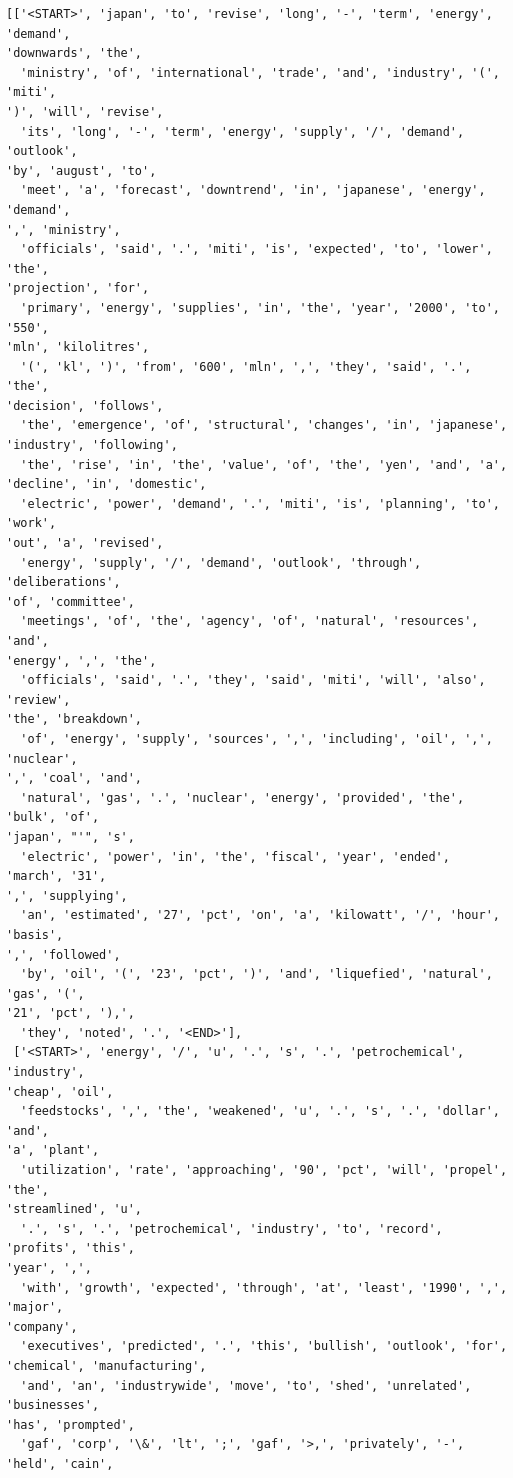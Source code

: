 \documentclass[11pt]{article}
\begin{document}
    \begin{Verbatim}[commandchars=\\\{\}]
[['<START>', 'japan', 'to', 'revise', 'long', '-', 'term', 'energy', 'demand',
'downwards', 'the',
  'ministry', 'of', 'international', 'trade', 'and', 'industry', '(', 'miti',
')', 'will', 'revise',
  'its', 'long', '-', 'term', 'energy', 'supply', '/', 'demand', 'outlook',
'by', 'august', 'to',
  'meet', 'a', 'forecast', 'downtrend', 'in', 'japanese', 'energy', 'demand',
',', 'ministry',
  'officials', 'said', '.', 'miti', 'is', 'expected', 'to', 'lower', 'the',
'projection', 'for',
  'primary', 'energy', 'supplies', 'in', 'the', 'year', '2000', 'to', '550',
'mln', 'kilolitres',
  '(', 'kl', ')', 'from', '600', 'mln', ',', 'they', 'said', '.', 'the',
'decision', 'follows',
  'the', 'emergence', 'of', 'structural', 'changes', 'in', 'japanese',
'industry', 'following',
  'the', 'rise', 'in', 'the', 'value', 'of', 'the', 'yen', 'and', 'a',
'decline', 'in', 'domestic',
  'electric', 'power', 'demand', '.', 'miti', 'is', 'planning', 'to', 'work',
'out', 'a', 'revised',
  'energy', 'supply', '/', 'demand', 'outlook', 'through', 'deliberations',
'of', 'committee',
  'meetings', 'of', 'the', 'agency', 'of', 'natural', 'resources', 'and',
'energy', ',', 'the',
  'officials', 'said', '.', 'they', 'said', 'miti', 'will', 'also', 'review',
'the', 'breakdown',
  'of', 'energy', 'supply', 'sources', ',', 'including', 'oil', ',', 'nuclear',
',', 'coal', 'and',
  'natural', 'gas', '.', 'nuclear', 'energy', 'provided', 'the', 'bulk', 'of',
'japan', "'", 's',
  'electric', 'power', 'in', 'the', 'fiscal', 'year', 'ended', 'march', '31',
',', 'supplying',
  'an', 'estimated', '27', 'pct', 'on', 'a', 'kilowatt', '/', 'hour', 'basis',
',', 'followed',
  'by', 'oil', '(', '23', 'pct', ')', 'and', 'liquefied', 'natural', 'gas', '(',
'21', 'pct', '),',
  'they', 'noted', '.', '<END>'],
 ['<START>', 'energy', '/', 'u', '.', 's', '.', 'petrochemical', 'industry',
'cheap', 'oil',
  'feedstocks', ',', 'the', 'weakened', 'u', '.', 's', '.', 'dollar', 'and',
'a', 'plant',
  'utilization', 'rate', 'approaching', '90', 'pct', 'will', 'propel', 'the',
'streamlined', 'u',
  '.', 's', '.', 'petrochemical', 'industry', 'to', 'record', 'profits', 'this',
'year', ',',
  'with', 'growth', 'expected', 'through', 'at', 'least', '1990', ',', 'major',
'company',
  'executives', 'predicted', '.', 'this', 'bullish', 'outlook', 'for',
'chemical', 'manufacturing',
  'and', 'an', 'industrywide', 'move', 'to', 'shed', 'unrelated', 'businesses',
'has', 'prompted',
  'gaf', 'corp', '\&', 'lt', ';', 'gaf', '>,', 'privately', '-', 'held', 'cain',

\end{Verbatim}
\end{document}

